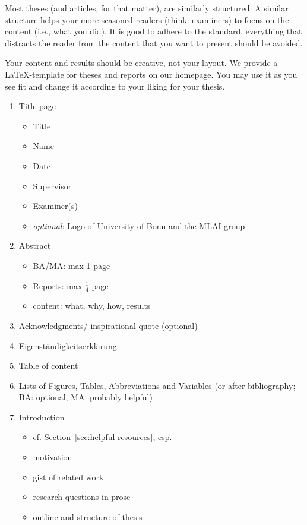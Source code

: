 \documentclass[logo, twocolumn]{mlai-report}
\begin{document}
Most theses (and articles, for that matter), are similarly structured. 
A similar structure helps your more seasoned readers (think: examiners) to focus on the content (i.e., what you did). 
It is good to adhere to the standard, everything that distracts the reader from the content that you want to present should be avoided.

Your content and results should be creative, not your layout.
We provide a \LaTeX-template for theses and reports on our homepage.
You may use it as you see fit and change it according to your liking for your thesis.


\begin{enumerate}
	\item Title page
		\begin{itemize}
			\item Title
			\item Name
			\item Date
			\item Supervisor
			\item Examiner(s)
			\item \emph{optional}: Logo of University of Bonn and the MLAI group
		\end{itemize}
	\item Abstract
		\begin{itemize}
			\item BA/MA: max 1 page
			\item Reports: max $\frac{1}{4}$ page
			\item content: what, why, how, results
		\end{itemize}
	\item Acknowledgments/ inspirational quote (optional)
	\item Eigenständigkeitserklärung
	\item Table of content
	\item Lists of Figures, Tables, Abbreviations and Variables (or after bibliography; BA: optional, MA: probably helpful)
	\item Introduction
		\begin{itemize}
			\item cf. Section~\ref{sec:helpful-resources}, esp. \cite{zobel_writing}
			\item motivation
			\item gist of related work
			\item research questions in prose
			\item outline and structure of thesis
		\end{itemize}

\end{enumerate}
\end{document}
